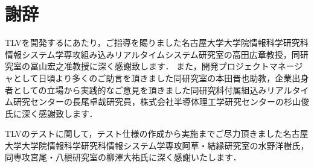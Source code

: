 \chapter*{謝辞}

TLVを開発するにあたり，ご指導を賜りました名古屋大学大学院情報科学研究科情報システム学専攻組み込みリアルタイムシステム研究室の高田広章教授，同研究室の冨山宏之准教授に深く感謝致します．
また，開発プロジェクトマネージャとして日頃より多くのご助言を頂きました同研究室の本田晋也助教，企業出身者としての立場から実践的なご意見を頂きました同研究科付属組込みリアルタイム研究センターの長尾卓哉研究員，株式会社半導体理工学研究センターの杉山俊氏に深く感謝致します．

TLVのテストに関して，テスト仕様の作成から実施までご尽力頂きました名古屋大学大学院情報科学研究科情報システム学専攻阿草・結縁研究室の水野洋樹氏，同専攻宮尾・八槇研究室の柳澤大祐氏に深く感謝いたします．
